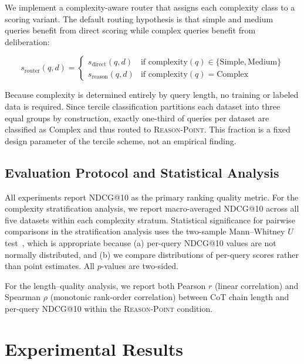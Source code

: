 \documentclass[12pt]{article}
\makeatletter
\newcommand{\ndcg}{NDCG@10}
\newcommand{\reason}{\textsc{Reason-Point}}
\makeatother
\begin{document}
We implement a complexity-aware router that assigns each complexity class to
a scoring variant.  The default routing hypothesis is that simple and medium
queries benefit from direct scoring while complex queries benefit from
deliberation:

\begin{equation}
  s_{\mathrm{router}}(q, d) =
  \begin{cases}
    s_{\mathrm{direct}}(q, d) & \text{if } \mathrm{complexity}(q) \in
      \{\text{Simple}, \text{Medium}\} \\
    s_{\mathrm{reason}}(q, d) & \text{if } \mathrm{complexity}(q) = \text{Complex}
  \end{cases}
\end{equation}

Because complexity is determined entirely by query length, no training or
labeled data is required.  Since tercile classification partitions each
dataset into three equal groups by construction, exactly one-third of queries
per dataset are classified as Complex and thus routed to \reason{}.
This fraction is a fixed design parameter of the tercile scheme, not an
empirical finding.

\subsection{Evaluation Protocol and Statistical Analysis}

All experiments report \ndcg{} as the primary ranking quality metric.
For the complexity stratification analysis, we report macro-averaged \ndcg{}
across all five datasets within each complexity stratum.
Statistical significance for pairwise comparisons in the stratification
analysis uses the two-sample Mann--Whitney $U$ test~\citep{mann1947test}, which
is appropriate because (a) per-query \ndcg{} values are not normally distributed,
and (b) we compare distributions of per-query scores rather than point estimates.
All $p$-values are two-sided.

For the length--quality analysis, we report both Pearson $r$ (linear
correlation) and Spearman $\rho$ (monotonic rank-order correlation) between
CoT chain length and per-query \ndcg{} within the \reason{} condition.

\section{Experimental Results}
\label{sec:results}
\end{document}
